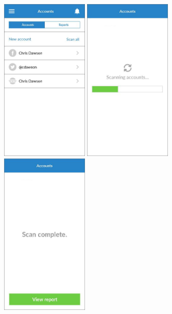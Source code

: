 \begin{figure}
  \subfigures
  \centering
  \begin{minipage}{4.6cm}
    \centering
    \includegraphics[width=4.2cm]{inc/ui_scan_step1.jpg}
    \caption{}
    \label{fig:ui_scan_step1}
  \end{minipage}
  \begin{minipage}{4.6cm}
    \centering
    \includegraphics[width=4.2cm]{inc/ui_scan_step2.jpg}
    \caption{}
    \label{fig:ui_scan_step2}
  \end{minipage}
  \begin{minipage}{4.6cm}
    \centering
    \includegraphics[width=4.2cm]{inc/ui_scan_step3.jpg}
    \caption{}
    \label{fig:ui_scan_step3}
  \end{minipage}
\end{figure}

